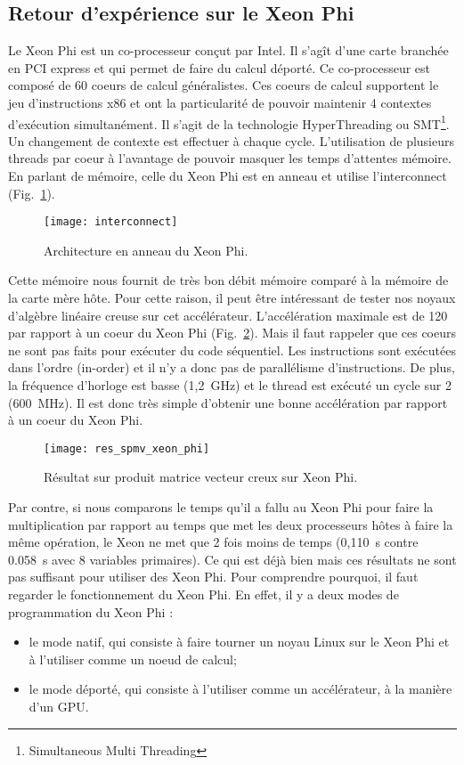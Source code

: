 \subsection{Retour d'expérience sur le Xeon Phi}
Le Xeon Phi est un co-processeur conçut par Intel.
%
Il s'agît d'une carte branchée en PCI express et qui permet de faire du calcul déporté.
%
Ce co-processeur est composé de 60 coeurs de calcul généralistes.
%
Ces coeurs de calcul supportent le jeu d'instructions x86 et ont la particularité de pouvoir maintenir 4 contextes d'exécution simultanément.
%
Il s'agit de la technologie HyperThreading ou SMT\footnote{Simultaneous Multi Threading}.
%
Un changement de contexte est effectuer à chaque cycle.
%
L'utilisation de plusieurs threads par coeur à l'avantage de pouvoir masquer les temps d'attentes mémoire.
%
En parlant de mémoire, celle du Xeon Phi est en anneau et utilise l'interconnect (Fig.~\ref{fig:interconnect}).

\begin{figure}[t!]
  \centering
  \texttt{[image: interconnect]}
  \caption{Architecture en anneau du Xeon Phi.}
  \label{fig:interconnect}
\end{figure}


Cette mémoire nous fournit de très bon débit mémoire comparé à la mémoire de la carte mère hôte.
%
Pour cette raison, il peut être intéressant de tester nos noyaux d'algèbre linéaire creuse sur cet accélérateur.
%
L'accélération maximale est de 120 par rapport à un coeur du Xeon Phi (Fig.~\ref{fig:res_spmv_xeon_phi}).
%
Mais il faut rappeler que ces coeurs ne sont pas faits pour exécuter du code séquentiel.
%
Les instructions sont exécutées dans l'ordre (in-order) et il n'y a donc pas de parallélisme d'instructions.
%
De plus, la fréquence d'horloge est basse (1,2~GHz) et le thread est exécuté un cycle sur 2 (600~MHz).
%
Il est donc très simple d'obtenir une bonne accélération par rapport à un coeur du Xeon Phi.

\begin{figure}[t!]
  \centering
  \texttt{[image: res\_spmv\_xeon\_phi]}
  \caption{Résultat sur produit matrice vecteur creux sur Xeon Phi.}
  \label{fig:res_spmv_xeon_phi}
\end{figure}



Par contre, si nous comparons le temps qu'il a fallu au Xeon Phi pour faire la multiplication par rapport au temps que met les deux processeurs hôtes à faire la même opération, le Xeon ne met que 2 fois moins de temps (0,110~s contre 0.058~s avec 8 variables primaires).
%
Ce qui est déjà bien mais ces résultats ne sont pas suffisant pour utiliser des Xeon Phi.
%
Pour comprendre pourquoi, il faut regarder le fonctionnement du Xeon Phi.
%
En effet, il y a deux modes de programmation du Xeon Phi :
\begin{itemize}
    \item le mode natif, qui consiste à faire tourner un noyau Linux sur le Xeon Phi et à l'utiliser comme un noeud de calcul;
    \item le mode déporté, qui consiste à l'utiliser comme un accélérateur, à la manière d'un GPU.
\end{itemize}

